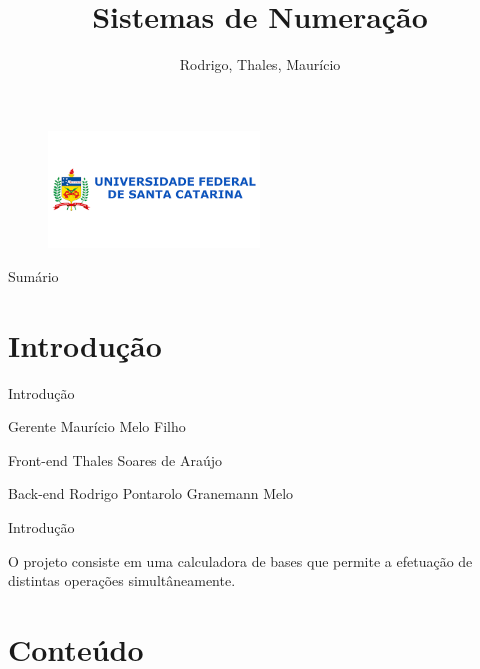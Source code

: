 \documentclass[11pt]{beamer}
\author[Rodrigo]{Rodrigo, Thales, Maurício}
\title{Sistemas de Numeração}
\institute[]{Engenharia da Computação \par Organização e Arquitetura de Computadores I}
\date{}
\begin{document}
\begin{frame}
\titlepage
    \begin{figure}[htb]
        \centering
        \includegraphics[width=0.5\textwidth]{imagens/ufsc.png}
    \end{figure}
\end{frame}

\begin{frame}{Sumário}
\tableofcontents 
\end{frame}

\section{Introdução}

\begin{frame}{Introdução}
    \begin{block}{Gerente}
        Maurício Melo Filho
    \end{block}
    \begin{block}{Front-end}
        Thales Soares de Araújo
    \end{block}
    \begin{block}{Back-end}
        Rodrigo Pontarolo Granemann Melo
    \end{block}
\end{frame}

\begin{frame}{Introdução}
    \begin{center}
        O projeto consiste em uma calculadora de bases que permite a efetuação de distintas operações simultâneamente.
    \end{center}
\end{frame}

\section{Conteúdo}
\end{document}
